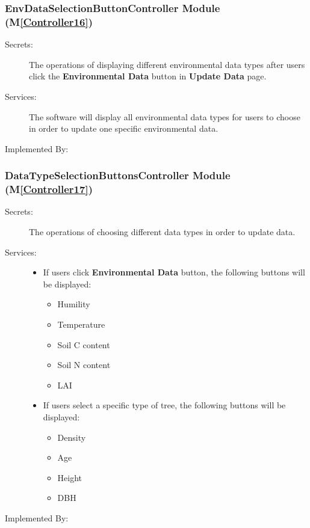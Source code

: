 \documentclass[12pt, titlepage]{article}
\newcommand{\mref}[1]{M\ref{#1}}
\begin{document}
\renewcommand{\bt}{\textbf{Environmental Data }}
\subsubsection{EnvDataSelectionButtonController Module (\mref{Controller16})}
\begin{description}
\item[Secrets:] The operations of displaying different environmental data types
 after users click the \bt button in \textbf{Update Data} page.
\item[Services:] The software will display all environmental data types for users to choose
in order to update one specific environmental data.
\item[Implemented By:] \progname{}
\end{description}

\subsubsection{DataTypeSelectionButtonsController Module (\mref{Controller17})}
\begin{description}
\item[Secrets:] The operations of choosing different data types in order to update data.
\item[Services:]  
\begin{itemize}
\item If users click \bt button, the following buttons will be displayed:

\begin{itemize}
\item Humility
\item Temperature
\item Soil C content
\item Soil N content
\item LAI
\end{itemize}

\item If users select a specific type of tree, the following buttons will be displayed:
\begin{itemize}
\item Density
\item Age
\item Height
\item DBH
\end{itemize}

\end{itemize}
\item[Implemented By:] \progname{}
\end{description}
\end{document}
